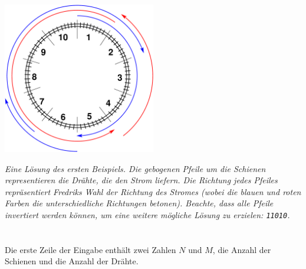 

\vspace{2mm}
\begin{center}
\includegraphics[width=0.5\textwidth]{alternatingfig.pdf}
\end{center}
\vspace{1mm}

{\em Eine Lösung des ersten Beispiels. Die gebogenen Pfeile um die Schienen representieren die Drähte, die den Strom liefern. Die Richtung jedes Pfeiles repräsentiert Fredriks Wahl der Richtung des Stromes (wobei die blauen und roten Farben die unterschiedliche Richtungen betonen). Beachte, dass alle Pfeile invertiert werden können, um eine weitere mögliche Lösung zu erzielen: \texttt{11010}.}


\section*{}
Die erste Zeile der Eingabe enthält zwei Zahlen $N$ und $M$, die Anzahl der Schienen und die Anzahl der Drähte.

